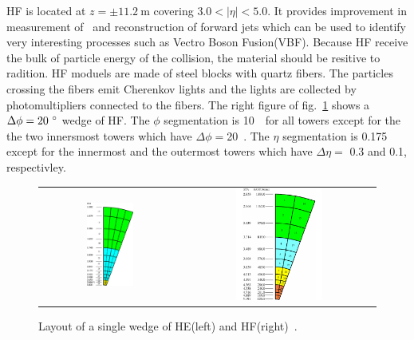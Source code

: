 HF is located at $z = \pm 11.2~\textrm{m}$ covering $3.0 < |\eta| < 5.0$. 
It provides improvement in measurement of \met\ 
and reconstruction of forward jets which can be used to identify very interesting 
processes such as Vectro Boson Fusion(VBF).%
Because HF receive the bulk of particle energy of the collision, 
the material should be resitive to radition. 
HF moduels are made of steel blocks with quartz fibers.
The particles crossing the fibers emit Cherenkov lights 
and the lights are collected by photomultipliers connected to 
the fibers. The right figure of fig.~\ref{fig:hcal_HEHF} shows 
a $\Delta \phi=20~^\circ$ wedge of HF.  
The $\phi$ segmentation is 10~\dg\ for all towers except for the 
the two innersmost towers which have $\Delta \phi=$20~\dg. 
The $\eta$ segmentation is 0.175 except for the innermost 
and the outermost towers which have $\Delta \eta=$ 0.3 and 0.1, respectivley. 
%
\begin{figure}[h] 
\vspace{1cm}
\centering 
\begin{tabular}{cc} 
\includegraphics[width=0.35\textwidth]{figures/Figure_005-002-a.pdf} & 
\includegraphics[width=0.47\textwidth]{figures/Figure_005-002-b.pdf} \\
\end{tabular} 
\caption{Layout of a single wedge of HE(left) and HF(right)~\cite{cmstdr1}.}
\label{fig:hcal_HEHF} 
\end{figure} 


